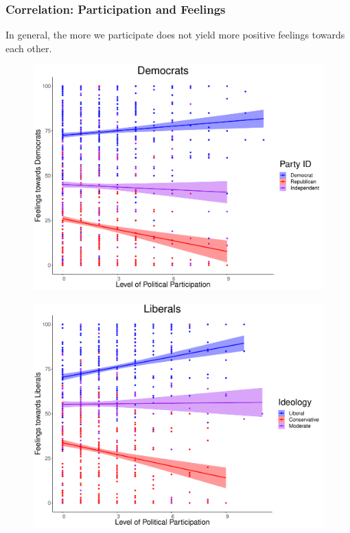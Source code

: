 \documentclass[14pt]{beamer}
\begin{document}
\begin{frame}
\frametitle{Correlation: Participation and Feelings}
\begin{center}
	In general, the more we participate does not yield more positive feelings towards each other.
\end{center}
\end{frame}


\begin{frame}
\begin{center}
	\begin{figure}[ht!]  
		{	 \includegraphics[width=.9\textwidth]{PFDem}}
	\end{figure}
\end{center}
\end{frame}

\begin{frame}
\begin{center}
\begin{figure}[ht!]  
	{	 \includegraphics[width=.9\textwidth]{PFLib}}
\end{figure}
\end{center}
\end{frame}
\end{document}
